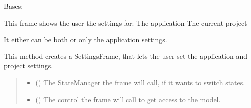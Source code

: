 \documentclass[letterpaper,10pt,english]{sphinxmanual}
\begin{document}
\begin{fulllineitems}
\label{\detokenize{apidoc/src.osm_configurator.view.toplevelframes:src.osm_configurator.view.toplevelframes.settings_frame.SettingsFrame}}
\pysigstartsignatures
{}
\pysigstopsignatures
\sphinxAtStartPar
Bases: {\hyperref[\detokenize{apidoc/src.osm_configurator.view.toplevelframes:src.osm_configurator.view.toplevelframes.top_level_frame.TopLevelFrame}]{}}

\sphinxAtStartPar
This frame shows the user the settings for:
\sphinxhyphen{} The application
\sphinxhyphen{} The current project

\sphinxAtStartPar
It either can be both or only the application settings.

\begin{fulllineitems}
\label{\detokenize{apidoc/src.osm_configurator.view.toplevelframes:src.osm_configurator.view.toplevelframes.settings_frame.SettingsFrame.__init__}}
\pysigstartsignatures
{}
\pysigstopsignatures
\sphinxAtStartPar
This method creates a SettingsFrame, that lets the user set the application and  project settings.
\begin{quote}\begin{description}
\begin{itemize}
\item {} 
\sphinxAtStartPar
{} ({\hyperref[\detokenize{apidoc/src.osm_configurator.view.states:src.osm_configurator.view.states.state_manager.StateManager}]{}}) \textendash{} The StateManager the frame will call, if it wants to switch states.

\item {} 
\sphinxAtStartPar
{} ({\hyperref[\detokenize{apidoc/src.osm_configurator.control:src.osm_configurator.control.control_interface.IControl}]{}}) \textendash{} The control the frame will call to get access to the model.


\end{itemize}
\end{description}
\end{quote}
\end{fulllineitems}
\end{fulllineitems}
\end{document}
